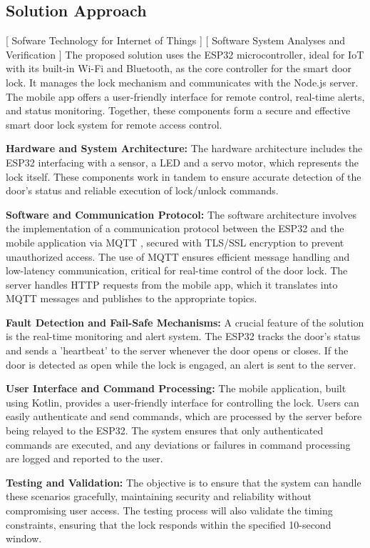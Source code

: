 \subsection{Solution Approach}
[ Sofware Technology for Internet of Things ] [ Software System Analyses and Verification ]
\newline
The proposed solution uses the ESP32 microcontroller, ideal for IoT with its built-in Wi-Fi and Bluetooth, as the core controller for the smart door lock. It manages the lock mechanism and communicates with the Node.js server. The mobile app offers a user-friendly interface for remote control, real-time alerts, and status monitoring. Together, these components form a secure and effective smart door lock system for remote access control.

\textbf{Hardware and System Architecture:}
The hardware architecture includes the ESP32 interfacing with a sensor, a LED and a servo motor, which represents the lock itself. These components work in tandem to ensure accurate detection of the door’s status and reliable execution of lock/unlock commands.

\textbf{Software and Communication Protocol:}
The software architecture involves the implementation of a communication protocol between the ESP32 and the mobile application via MQTT \cite{mqtt-protocol}, secured with TLS/SSL encryption to prevent unauthorized access. The use of MQTT ensures efficient message handling and low-latency communication, critical for real-time control of the door lock. The server handles HTTP \cite{http}requests from the mobile app, which it translates into MQTT messages and publishes to the appropriate topics.

\textbf{Fault Detection and Fail-Safe Mechanisms:}
A crucial feature of the solution is the real-time monitoring and alert system. The ESP32 tracks the door's status and sends a 'heartbeat' to the server whenever the door opens or closes. If the door is detected as open while the lock is engaged, an alert is sent to the server.

\textbf{User Interface and Command Processing:}
The mobile application, built using Kotlin, provides a user-friendly interface for controlling the lock. Users can easily authenticate and send commands, which are processed by the server before being relayed to the ESP32. The system ensures that only authenticated commands are executed, and any deviations or failures in command processing are logged and reported to the user.

\textbf{Testing and Validation:}
 The objective is to ensure that the system can handle these scenarios gracefully, maintaining security and reliability without compromising user access. The testing process will also validate the timing constraints, ensuring that the lock responds within the specified 10-second window.
